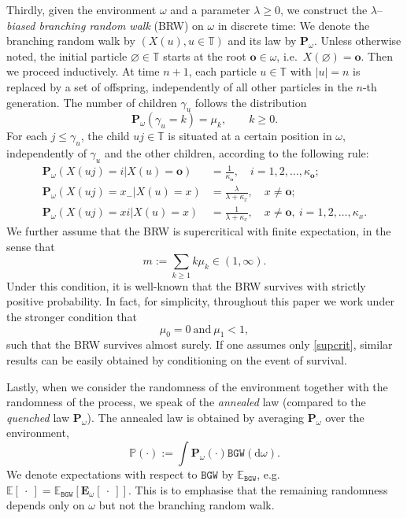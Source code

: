 \documentclass[11 pt]{article}
\theoremstyle{definition}
\numberwithin{equation}{section}
\newcommand{\TT}{\mathbb{T}} %
\newcommand{\dd}{\mathrm{d}} %
\newcommand{\EE}{\mathbb{E}} %
\newcommand{\PP}{\mathbb{P}} %
\newcommand{\rt}{\mathbf{o}} %
\newcommand{\Pw}{\mathbf{P}_{\omega}} %
\begin{document}
Thirdly, given the environment $\omega$ and a parameter $\lambda \geq 0$, we construct the $\lambda$--\emph{biased branching random walk} (BRW) on $\omega$ in discrete time: We denote the branching random walk by $(X(u),u\in \TT)$ and its law by $\Pw$. Unless otherwise noted, the initial particle $\varnothing \in \TT$ starts at the root $\rt \in \omega$, i.e.\ $X(\varnothing)=\rt$. Then we proceed inductively. At time $n+1$, each particle $u\in \TT$ with $\vert u \vert =n$ is replaced by a set of offspring, independently of all other particles in the $n$-th generation. The number of children 
 $\gamma_u$ follows the distribution 
\begin{equation*}
	\Pw(\gamma_u= k)=\mu_k,  \qquad k\ge 0.
\end{equation*}
For each $j\le \gamma_u$, the child $uj\in \TT$ is situated at a certain position in $\omega$, independently of $\gamma_u$ and the other children,  according to the following rule:
\begin{align*}
 	\Pw(X(uj)= i | X(u)=\rt) &=\frac{1}{\kappa_{\rt}},\quad i=1,2,\ldots, \kappa_{\rt};\\
	\Pw(X(uj) = x_- | X(u) =x) &=\frac{\lambda}{\lambda +\kappa_x}, \quad x\ne \rt;\\
 	\Pw(X(uj) = xi | X(u) =x) &=\frac{1}{\lambda +\kappa_x}, \quad x\ne \rt,~ i=1,2,\ldots, \kappa_x.
\end{align*}
We further assume that the BRW is supercritical with finite expectation, in the sense that
\begin{equation}\label{supcrit}
	m:= \sum_{k\ge 1} k \mu_k \in (1,\infty).  
\end{equation}
Under this condition, it is well-known that the BRW survives with strictly positive probability. 
In fact, for simplicity, throughout this paper we work under the stronger condition that 
\begin{equation} \label{assuonBranching}
	\mu_0=0 ~\text{and}~ \mu_1<1,
\end{equation} 
such that the BRW survives almost surely. If one assumes only \eqref{supcrit}, similar results can be easily obtained by conditioning on the event of survival.

Lastly, when we consider the randomness of the environment together with the randomness of the process, we speak of the \emph{annealed} law (compared to the \emph{quenched} law $\Pw$). The annealed law is obtained by averaging $\Pw$ over the environment,
\begin{equation*}
	\PP(\cdot):= \int \Pw(\cdot) \mathtt{BGW}(\dd \omega).
\end{equation*} 
We denote expectations with respect to $\mathtt{BGW}$ by $\EE_{\mathtt{BGW}}$, e.g.\  $\EE[\ \cdot\ ] = \EE_{\mathtt{BGW}}[\mathbf{E}_\omega[\ \cdot\ ]]$. This is to emphasise that the remaining randomness depends only on $\omega$ but not the branching random walk.
\end{document}
